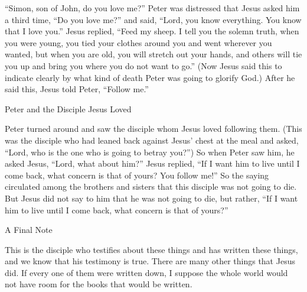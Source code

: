 {“Simon,
son of John,
do you love
me?” Peter
was distressed
that
Jesus asked
him
a third time,
“Do you love
me?” and
said, “Lord,
you
know
everything.
You
know
that
I love
you.”
Jesus
replied, “Feed
my
sheep.
I tell
you
the solemn truth,
when
you were
young,
you tied
your
clothes around
you and
went
wherever
you wanted,
but
when
you are old,
you will stretch out
your
hands,
and
others
will tie
you
up
and
bring
you where
you do
not
want to go.”
(Now
Jesus said
this
to indicate clearly
by what kind
of death
Peter was going to glorify
God.) After
he said
this,
Jesus told
Peter, “Follow
me.”
\par }{\SH Peter and the Disciple Jesus Loved
\par }{\PP {}Peter
turned around
and saw
the disciple
whom
Jesus
loved
following
them. (This was the disciple who
had leaned back
against
Jesus’ chest
at
the meal
and
asked, “Lord,
who
is
the one who is going to betray
you?”)
So
when Peter
saw
him,
he asked
Jesus,
“Lord,
what
about him?”
Jesus
replied, “If
I want
him
to live
until
I come back,
what
concern is that of yours? You
follow
me!”
So
the saying
circulated
among
the brothers and sisters
that
this
disciple
was
not
going to die.
But
Jesus
did
not
say
to him
that
he was
not
going to die,
but rather,
“If
I want
him
to live
until
I come back,
what concern is that of yours?”
\par }{\SH A Final Note
\par }{\PP {}This
is
the disciple
who testifies
about
these things
and
has written
these things,
and
we know
that
his
testimony
is
true.
There are
many
other things
that
Jesus
did.
If
every
one
of them
were written down,
I suppose
the whole world
would
not
have room
for the books
that would be written.
\par }